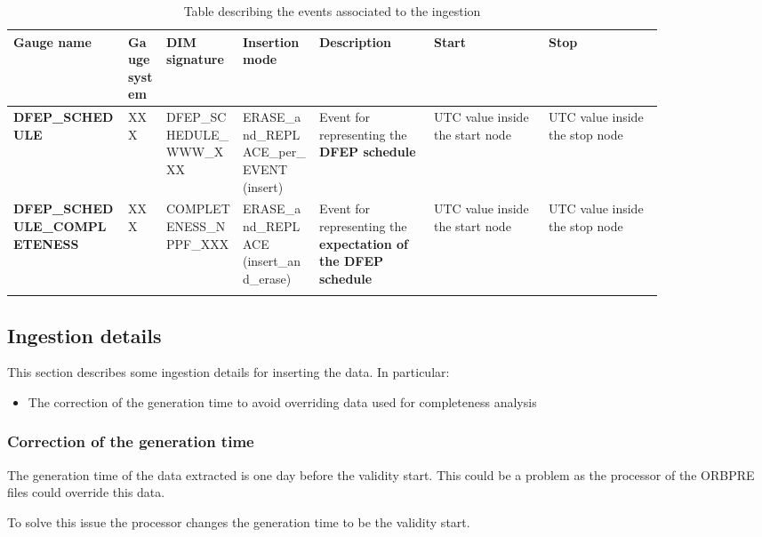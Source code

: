 \begin{landscape}
\begin{longtable}{|M{0.15\linewidth}|M{0.05\linewidth}|M{0.10\linewidth}|M{0.10\linewidth}|M{0.15\linewidth}|M{0.15\linewidth}|M{0.15\linewidth}|}
\hline \textbf{Gauge name} & \textbf{Gauge system} & \textbf{DIM signature} & \textbf{Insertion mode} & \textbf{Description} & \textbf{Start} & \textbf{Stop} \\ \hline
\textbf{DFEP\_SCHEDULE} & XXX & DFEP\_SCHEDULE\_WWW\_XXX & ERASE\_and\_REPLACE\_per\_EVENT (insert) & Event for representing the \textbf{DFEP schedule} & UTC value inside the start node & UTC value inside the stop node \\ \hline
\textbf{DFEP\_SCHEDULE\_COMPLETENESS} & XXX & \- COMPLETENESS\_NPPF\_XXX & ERASE\_and\_REPLACE (insert\_and\_erase) & Event for representing the \textbf{expectation of the DFEP schedule} & UTC value inside the start node & UTC value inside the stop node \\ \hline
\caption{Table describing the events associated to the ingestion}
\label{tb:description_events_ingestion_dfep_schedule}
\end{longtable}
\end{landscape}

\subsection{Ingestion details}

This section describes some ingestion details for inserting the data. In particular:

\begin{itemize} 

\item The correction of the generation time to avoid overriding data used for completeness analysis
  
\end{itemize}

\subsubsection{Correction of the generation time}

The generation time of the data extracted is one day before the validity start. This could be a problem as the processor of the ORBPRE files could override this data.

To solve this issue the processor changes the generation time to be the validity start.
